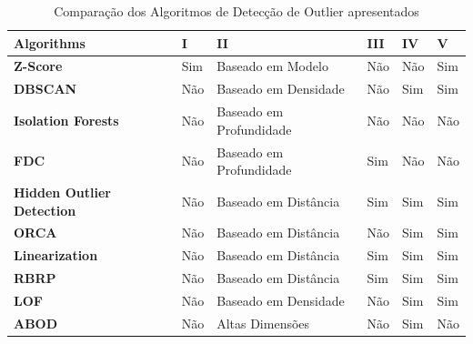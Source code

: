 \begin{table}[]
	\centering
	\begin{tabular}{|l|l|l|l|l|l|}
		\hline
		\textbf{Algorithms}               & \textbf{I} & \textbf{II}             & \textbf{III} & \textbf{IV} & \textbf{V} \\ \hline
		\textbf{Z-Score}                  & Sim        & Baseado em Modelo       & Não          & Não         & Sim        \\ \hline
		\textbf{DBSCAN}                   & Não        & Baseado em Densidade    & Não          & Sim         & Sim        \\ \hline
		\textbf{Isolation Forests}        & Não        & Baseado em Profundidade & Não          & Não         & Não        \\ \hline
		\textbf{FDC}                      & Não        & Baseado em Profundidade & Sim          & Não         & Não        \\ \hline
		\textbf{Hidden Outlier Detection} & Não        & Baseado em Distância    & Sim          & Sim         & Sim        \\ \hline
		\textbf{ORCA}                     & Não        & Baseado em Distância    & Não          & Sim         & Sim        \\ \hline
		\textbf{Linearization}            & Não        & Baseado em Distância    & Sim          & Sim         & Sim        \\ \hline
		\textbf{RBRP}                     & Não        & Baseado em Distância    & Sim          & Sim         & Sim        \\ \hline
		\textbf{LOF}                      & Não        & Baseado em Densidade    & Não          & Sim         & Sim        \\ \hline
		\textbf{ABOD}                     & Não        & Altas Dimensões         & Não          & Sim         & Não        \\ \hline
	\end{tabular}
	\caption{Comparação dos Algoritmos de Detecção de Outlier apresentados}
	\label{table:algorithms-comparison}
\end{table}

